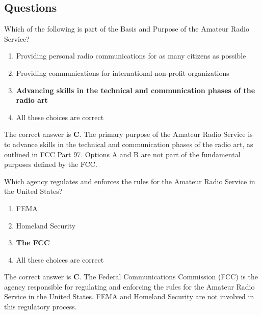 \subsection*{Questions}
\begin{tcolorbox}[colback=gray!10!white,colframe=black!75!black,title={T1A01}]
    Which of the following is part of the Basis and Purpose of the Amateur Radio Service?
    \begin{enumerate}[label=\Alph*),noitemsep]
        \item Providing personal radio communications for as many citizens as possible
        \item Providing communications for international non-profit organizations
        \item \textbf{Advancing skills in the technical and communication phases of the radio art}
        \item All these choices are correct
    \end{enumerate}
\end{tcolorbox}
The correct answer is \textbf{C}. The primary purpose of the Amateur Radio Service is to advance skills in the technical and communication phases of the radio art, as outlined in FCC Part 97. Options A and B are not part of the fundamental purposes defined by the FCC.

\begin{tcolorbox}[colback=gray!10!white,colframe=black!75!black,title={T1A02}]
    Which agency regulates and enforces the rules for the Amateur Radio Service in the United States?
    \begin{enumerate}[label=\Alph*),noitemsep]
        \item FEMA
        \item Homeland Security
        \item \textbf{The FCC}
        \item All these choices are correct
    \end{enumerate}
\end{tcolorbox}
The correct answer is \textbf{C}. The Federal Communications Commission (FCC) is the agency responsible for regulating and enforcing the rules for the Amateur Radio Service in the United States. FEMA and Homeland Security are not involved in this regulatory process.

